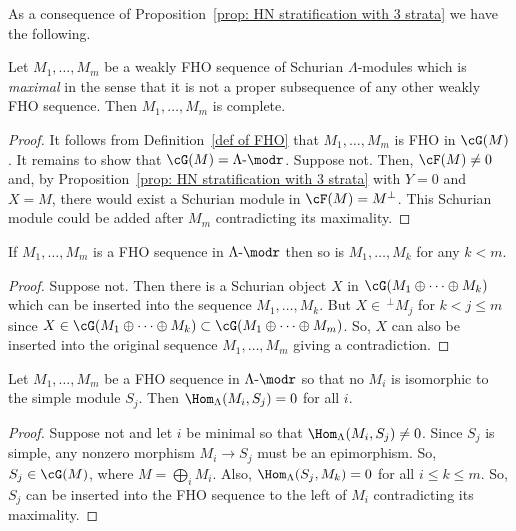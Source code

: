 As a consequence of Proposition~\ref{prop: HN stratification with 3 strata} we have the following.


\begin{coro}\label{cor: max weakly forward hom-orth is complete}
Let $M_1,\ldots,M_m$ be a weakly FHO sequence of Schurian $\Lambda$-modules which is \emph{maximal} in the sense that it is not a proper subsequence of any other weakly FHO sequence. Then $M_1,\ldots,M_m$ is complete.
\end{coro}

\begin{proof}
It follows from Definition~\ref{def of FHO} that $M_1,\ldots,M_m$ is FHO in $\cG(M)$. It remains to show that $\cG(M)=\Lambda\text{-}\modr $. Suppose not. Then, $\cF(M)\neq0$ and, by Proposition~\ref{prop: HN stratification with 3 strata} with $Y=0$ and $X=M$, there would exist a Schurian module in $\cF(M)=M^\perp$. This Schurian module could be added after $M_m$ contradicting its maximality.
\end{proof}

\begin{prop}\label{prop:subsequence of hom orth is hom orth}
If $M_1,\ldots,M_m$ is a FHO sequence in $\Lambda\text{-}\modr $ then so is $M_1,\ldots,M_k$ for any $k<m$.
\end{prop}

\begin{proof}
Suppose not. Then there is a Schurian object $X$ in $\cG(M_1\oplus \cdots\oplus M_k)$ which can be inserted into the sequence $M_1,\ldots,M_k$. But $X\in \,^\perp M_j$ for $k<j\le m$ since $X\in \cG(M_1\oplus\cdots\oplus M_k)\subset \cG(M_1\oplus\cdots\oplus M_m)$. So, $X$ can also be inserted into the original sequence $M_1,\ldots,M_m$ giving a contradiction.
\end{proof}

\begin{lemm}\label{lem:when Sk is not one of the Mi}
Let $M_1,\ldots,M_m$ be a FHO sequence in $\Lambda\text{-}\modr $ so that no $M_i$ is isomorphic to the simple module $S_j$. Then $\Hom_\Lambda(M_i,S_j)=0$ for all $i$.
\end{lemm}

\begin{proof}
Suppose not and let $i$ be minimal so that $\Hom_\Lambda(M_i,S_j)\neq0$. Since $S_j$ is simple, any nonzero morphism $M_i\to S_j$ must be an epimorphism. So, $S_j\in\cG(M)$, where $M=\bigoplus_iM_i$. Also, $\Hom_\Lambda(S_j,M_k)=0$ for all $i\le k\le m$. So, $S_j$ can be inserted into the FHO sequence to the left of $M_i$ contradicting its maximality.
\end{proof}

